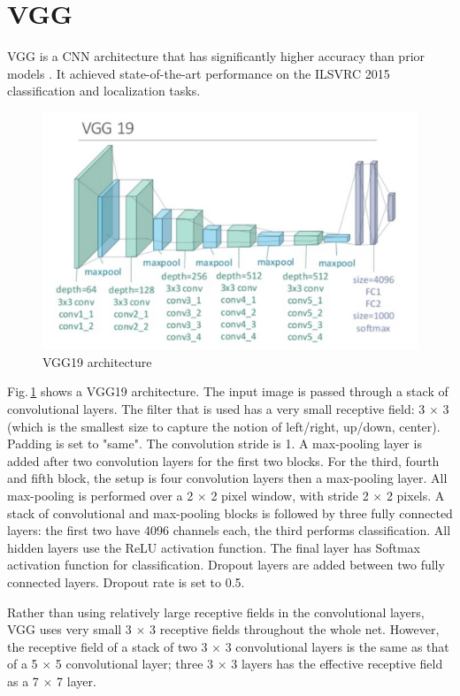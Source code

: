 \section{VGG}
\label{arch_vgg}

VGG is a CNN architecture that has significantly higher accuracy than prior models \citep{vgg}. It achieved state-of-the-art performance on the ILSVRC 2015 \citep{ILSVRC15} classification and localization tasks. 

\begin{figure}[h]
	\centering
	\includegraphics[scale=0.4]{Figs/vgg.png}
    \caption{VGG19 architecture \citep{Zheng2018}}
    \label{VGG}
\end{figure}

  Fig.\,\ref{VGG} shows a VGG19 architecture. The input image is passed through a stack of convolutional layers. The filter that is used has a very small receptive field: 3 $\times$ 3 (which is the smallest size to capture the notion of left/right, up/down, center). Padding is set to "same". The convolution stride is 1. A max-pooling layer is added after two convolution layers for the first two blocks. For the third, fourth and fifth block, the setup is four convolution layers then a max-pooling layer. All max-pooling is performed over a 2 $\times$ 2 pixel window, with stride 2 $\times$ 2 pixels. A stack of convolutional and max-pooling blocks is followed by three fully connected layers: the first two have 4096 channels each, the third performs classification. All hidden layers use the ReLU activation function. The final layer has Softmax activation function for classification. Dropout layers are added between two fully connected layers. Dropout rate is set to 0.5.

Rather than using relatively large receptive fields in the convolutional layers, VGG uses very small 3 $\times$ 3 receptive fields throughout the whole net. However, the receptive field of a stack of two 3 $\times$ 3 convolutional layers is the same as that of a 5 $\times$ 5 convolutional layer; three 3 $\times$ 3 layers has the effective receptive field as a 7 $\times$ 7 layer. 

